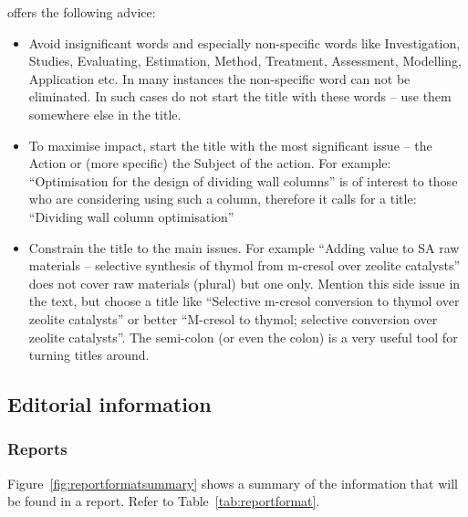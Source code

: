 \documentclass[a5paper, 10pt]{article}
\begin{document}
\citet{mandersloot} offers the following advice:
\begin{itemize}
\item Avoid insignificant words and especially non-specific words like
  Investigation, Studies, Evaluating, Estimation, Method, Treatment,
  Assessment, Modelling, Application etc. In many instances the
  non-specific word can not be eliminated. In such cases do not start
  the title with these words -- use them somewhere else in the title.

\item To maximise impact, start the title with the most significant
  issue -- the Action or (more specific) the Subject of the action.
  For example: ``Optimisation for the design of dividing wall columns''
  is of interest to those who are considering using such a column,
  therefore it calls for a title: ``Dividing wall column optimisation''

\item Constrain the title to the main issues. For example ``Adding
  value to SA raw materials -- selective synthesis of thymol from
  m-cresol over zeolite catalysts'' does not cover raw materials
  (plural) but one only. Mention this side issue in the text, but
  choose a title like ``Selective m-cresol conversion to thymol over
  zeolite catalysts'' or better ``M-cresol to thymol; selective
  conversion over zeolite catalysts''.  The semi-colon (or even the
  colon) is a very useful tool for turning titles around.
\end{itemize}

\subsection{Editorial information}

\subsubsection{Reports}
Figure~\ref{fig:reportformatsummary} shows a summary of the information that
will be found in a report.  Refer to Table~\ref{tab:reportformat}.
\end{document}
